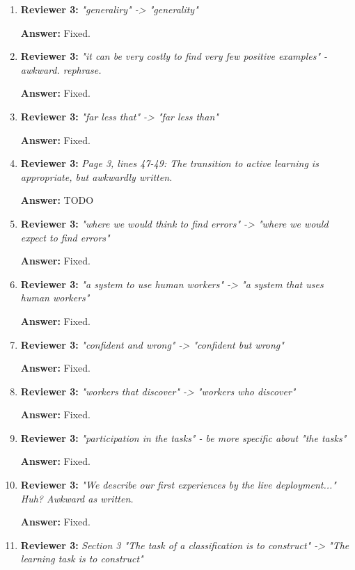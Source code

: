 \documentclass[letterpaper]{article}
\begin{document}
\begin{enumerate}
\item \textbf{Reviewer 3:} \emph{ "generaliry" -> "generality"}

\textbf{Answer:} Fixed.

\item \textbf{Reviewer 3:} \emph{ "it can be very costly to find very few positive examples" - awkward. rephrase.}

\textbf{Answer:} Fixed.

\item \textbf{Reviewer 3:} \emph{ "far less that" -> "far less than"}

\textbf{Answer:} Fixed.

\item \textbf{Reviewer 3:} \emph{ Page 3, lines 47-49: The transition to active learning is appropriate, but awkwardly written.}

\textbf{Answer:} TODO

\item \textbf{Reviewer 3:} \emph{ "where we would think to find errors" -> "where we would expect to find errors"}

\textbf{Answer:} Fixed.

\item \textbf{Reviewer 3:} \emph{ "a system to use human workers" -> "a system that uses human workers"}

\textbf{Answer:} Fixed.

\item \textbf{Reviewer 3:} \emph{ "confident and wrong" -> "confident but wrong"}

\textbf{Answer:} Fixed.

\item \textbf{Reviewer 3:} \emph{ "workers that discover" -> "workers who discover"}

\textbf{Answer:} Fixed.

\item \textbf{Reviewer 3:} \emph{ "participation in the tasks" - be more specific about "the tasks"}

\textbf{Answer:} Fixed.

\item \textbf{Reviewer 3:} \emph{ "We describe our first experiences by the live deployment..." Huh?  Awkward as written.}

\textbf{Answer:} Fixed.

\item \textbf{Reviewer 3:} \emph{ Section 3 "The task of a classification is to construct" -> "The learning task is to construct"}


\end{enumerate}
\end{document}
